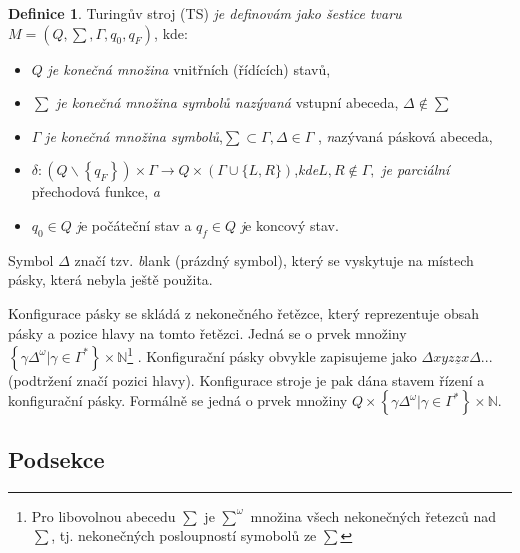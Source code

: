 \documentclass[a4 paper,11pt]{article}
\theoremstyle{definition}
\newtheorem{definice}{Definice}
\theoremstyle{plain}
\begin{document}
    
\begin{definice} Turingův stroj (TS) \textit {je definovám jako šestice tvaru} $M = \left(Q,\sum, \Gamma, q_{0}, q_{F} \right)$, kde:

\begin{itemize}
\setlength{\itemsep}{0.05em}

 \item $Q$ \textit{je konečná množina}  vnitřních (řídících) stavů,
 
 \item $\sum$ \emph{je konečná množina symbolů nazývaná} vstupní abeceda, $\Delta \notin \sum $
 
 \item $\Gamma$ \emph{je konečná množina symbolů},$\sum \subset \Gamma, \Delta \in \Gamma $ , \emph nazývaná pásková abeceda,

 
 \item $\delta:\left(Q \backslash \left\{q_{F} \right\} \right) \times \Gamma \rightarrow Q \times(\Gamma \cup\{L,R\})$,\emph{kde}$L,R\notin \Gamma,$\emph{ je parciální} přechodová funkce, \emph{a}
 
 \item $q_{0} \in Q $ \emph je počáteční stav a $q_{f} \in Q $ \emph je koncový stav.
 
 
\end{itemize}

Symbol $\Delta$ značí tzv. \emph blank (prázdný symbol), který se vyskytuje na místech pásky, která nebyla ještě použita.
	
	Konfigurace pásky se skládá z nekonečného řetězce, který reprezentuje obsah pásky a pozice hlavy na tomto řetězci. Jedná se o prvek množiny $\left\{\gamma \Delta^{\omega} | \gamma \in \Gamma^{*}\right\} \times \mathbb{N}$\footnote{Pro libovolnou abecedu $\sum$ je $\sum^{\omega}$ množina všech nekonečných řetezců nad $\sum$, tj. nekonečných posloupností symobolů ze $\sum$} . Konfigurační pásky obvykle zapisujeme jako $\Delta x y z \underline{z} x \Delta ...$ (podtržení značí pozici hlavy). Konfigurace stroje je pak dána stavem řízení a konfigurační pásky. Formálně se jedná o prvek množiny $Q \times\left\{\gamma \Delta^{\omega} | \gamma \in \Gamma^{*}\right\} \times \mathbb{N}$.

\end{definice} 






\subsection{Podsekce}
\end{document}
